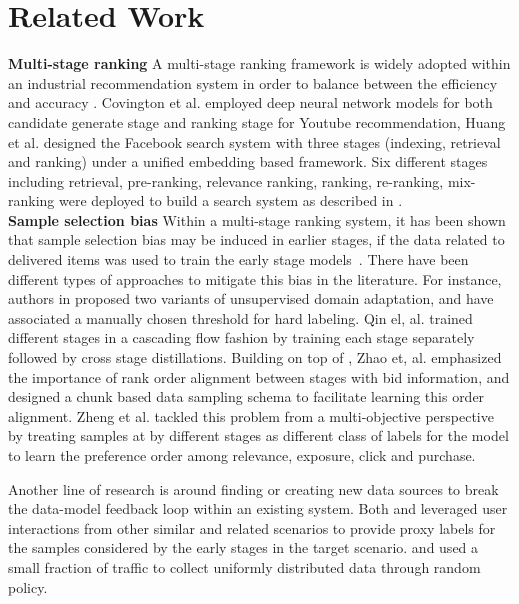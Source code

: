 \section{Related Work}
\label{sec:related}
\textbf{Multi-stage ranking} A multi-stage ranking framework is widely adopted within an industrial recommendation system in order to balance between the efficiency and accuracy \cite{deepRSsurvey}. Covington et al. \cite{youtube} employed deep neural network models for both candidate generate stage and ranking stage for Youtube recommendation, Huang et al. \cite{fbsearchemb} designed the Facebook search system with three stages (indexing, retrieval and ranking) under a unified embedding based framework. Six different stages including retrieval, pre-ranking, relevance ranking, ranking, re-ranking, mix-ranking were deployed to build a search system as described in \cite{taobaosearch}.  \\

\noindent \textbf{Sample selection bias} Within a multi-stage ranking system, it has been shown that sample selection bias may be induced in earlier stages, if the data related to delivered items was used to train the early stage models~\cite{pin2024kdd}. There have been different types of approaches to mitigate this bias in the literature. For instance, authors in \cite{pin2024kdd} proposed two variants of unsupervised domain adaptation, and have associated a manually chosen threshold for hard labeling. 
Qin el, al. \cite{rankflow} trained different stages in a cascading flow fashion by training each stage separately followed by cross stage distillations. Building on top of \cite{rankflow}, Zhao et, al.\cite{COPR} emphasized the importance of rank order alignment between stages with bid information, and designed a chunk based data sampling schema to facilitate learning this order alignment. Zheng et al. \cite{zheng2022multiobjective} tackled this problem from a multi-objective perspective by treating samples at by different stages as different class of labels for the model to learn the preference order among relevance, exposure, click and purchase. 
 
Another line of research is around finding or creating new data sources to break the data-model feedback loop within an existing system. Both \cite{rec4ad} and \cite{zhang2023rethinkingsearch} leveraged user interactions from other similar and related scenarios to provide proxy labels for the samples considered by the early stages in the target scenario. \cite{autodebias} and \cite{uniform2020} used a small fraction of traffic to collect uniformly distributed data through random policy.  \\


